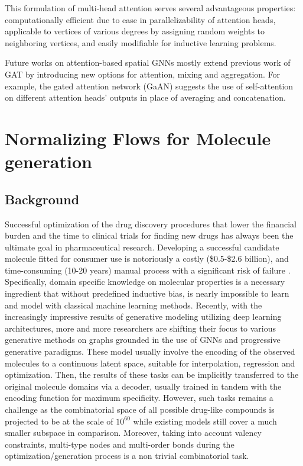 This formulation of multi-head attention serves several advantageous properties:
computationally efficient due to ease in parallelizability of attention heads,
applicable to vertices of various degrees by assigning random weights to
neighboring vertices, and easily modifiable for inductive learning problems.

Future works on attention-based spatial GNNs mostly extend previous work of GAT
by introducing new options for attention, mixing and aggregation. For example,
the gated attention network (GaAN) \citep{zhangGaANGatedAttention2018} suggests
the use of self-attention on different attention heads' outputs in place of
averaging and concatenation.

\chapter{Normalizing Flows for Molecule generation}
\label{c:gnf}
\section{Background}

Successful optimization of the drug discovery procedures that lower the
financial burden and the time to clinical trials for finding new drugs has
always been the ultimate goal in pharmaceutical research. Developing a
successful candidate molecule fitted for consumer use is notoriously a costly
(\$0.5-\$2.6 billion), and time-consuming (10-20 years) manual process with a
significant risk of failure \citep{paulHowImproveProductivity2010}.
Specifically, domain specific knowledge on molecular properties is a necessary
ingredient that without predefined inductive bias, is nearly impossible to learn
and model with classical machine learning methods. Recently, with the
increasingly impressive results of generative modeling utilizing deep learning
architectures, more and more researchers are shifting their focus to various
generative methods on graphs grounded in the use of GNNs and progressive
generative paradigms. These model usually involve the encoding of the observed
molecules to a continuous latent space, suitable for interpolation, regression
and optimization. Then, the results of these tasks can be implicitly transferred
to the original molecule domains via a decoder, usually trained in tandem with
the encoding function for maximum specificity. However, such tasks remains a
challenge as the combinatorial space of all possible drug-like compounds is
projected to be at the scale of $10^{60}$
\citep{mullardDrugmakerGuideGalaxy2017} while existing models still cover a much
smaller subspace in comparison. Moreover, taking into account valency
constraints, multi-type nodes and multi-order bonds during the
optimization/generation process is a non trivial combinatorial task.

